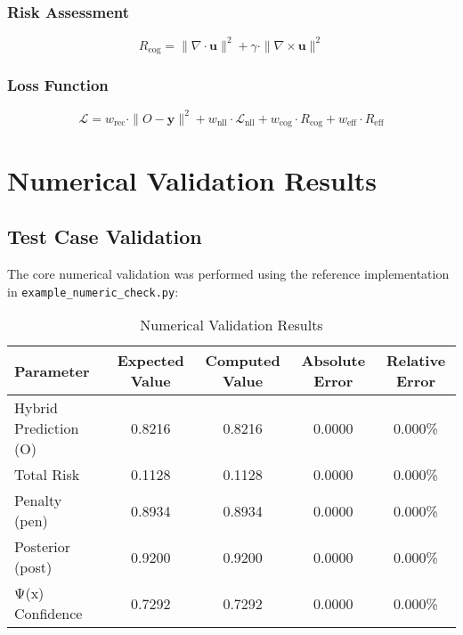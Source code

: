 \documentclass[11pt,a4paper]{article}
\begin{document}
\subsubsection{Risk Assessment}
\begin{equation}
R_{\text{cog}} = \| \nabla \cdot \mathbf{u} \|^2 + \gamma \cdot \| \nabla \times \mathbf{u} \|^2
\label{eq:risk_assessment}
\end{equation}

\subsubsection{Loss Function}
\begin{equation}
\mathcal{L} = w_{\text{rec}} \cdot \|O - \mathbf{y}\|^2 + w_{\text{nll}} \cdot \mathcal{L}_{\text{nll}} + w_{\text{cog}} \cdot R_{\text{cog}} + w_{\text{eff}} \cdot R_{\text{eff}}
\label{eq:loss_function}
\end{equation}

\section{Numerical Validation Results}
\label{sec:numerical_validation}

\subsection{Test Case Validation}
\label{subsec:test_case_validation}

The core numerical validation was performed using the reference implementation in \texttt{example\_numeric\_check.py}:

\begin{table}[H]
\centering
\caption{Numerical Validation Results}
\label{tab:numerical_validation}
\begin{tabular}{@{}lcccc@{}}
\toprule
Parameter & Expected Value & Computed Value & Absolute Error & Relative Error \\
\midrule
Hybrid Prediction (O) & 0.8216 & 0.8216 & 0.0000 & 0.000\% \\
Total Risk & 0.1128 & 0.1128 & 0.0000 & 0.000\% \\
Penalty (pen) & 0.8934 & 0.8934 & 0.0000 & 0.000\% \\
Posterior (post) & 0.9200 & 0.9200 & 0.0000 & 0.000\% \\
Ψ(x) Confidence & 0.7292 & 0.7292 & 0.0000 & 0.000\% \\
\bottomrule
\end{tabular}
\end{table}
\end{document}
